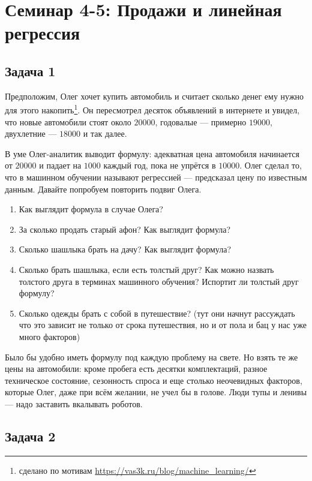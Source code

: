 \documentclass[12pt, a4paper, oneside]{article}
\begin{document}
	
\section*{Семинар 4-5: Продажи и линейная регрессия }

\subsection*{Задача 1}

Предположим, Олег хочет купить автомобиль и считает сколько денег ему нужно для этого накопить\footnote{сделано по мотивам \url{https://vas3k.ru/blog/machine_learning/}}. Он пересмотрел десяток объявлений в интернете и увидел, что новые автомобили стоят около $20 000$, годовалые — примерно $19 000$, двухлетние — $18 000$ и так далее.

В уме Олег-аналитик выводит формулу: адекватная цена автомобиля начинается от $20 000$ и падает на $1000$ каждый год, пока не упрётся в $10 000$. Олег сделал то, что в машинном обучении называют регрессией — предсказал цену по известным данным. Давайте попробуем повторить подвиг Олега.

\begin{enumerate}
	\item Как выглядит формула в случае Олега?
	\item За сколько продать старый афон? Как выглядит формула?
	\item Сколько шашлыка брать на дачу? Как выглядит формула?
	\item Сколько брать шашлыка, если есть толстый друг? Как можно назвать толстого друга в терминах машинного обучения? Испортит ли толстый друг формулу?
	\item Сколько одежды брать с собой в путешествие? (тут они начнут рассуждать что это зависит не только от срока путешествия, но и от пола и бац у нас уже много факторов)
\end{enumerate}

Было бы удобно иметь формулу под каждую проблему на свете. Но взять те же цены на автомобили: кроме пробега есть десятки комплектаций, разное техническое состояние, сезонность спроса и еще столько неочевидных факторов, которые Олег, даже при всём желании, не учел бы в голове. Люди тупы и ленивы — надо заставить вкалывать роботов.

\subsection*{Задача 2}
\end{document}
